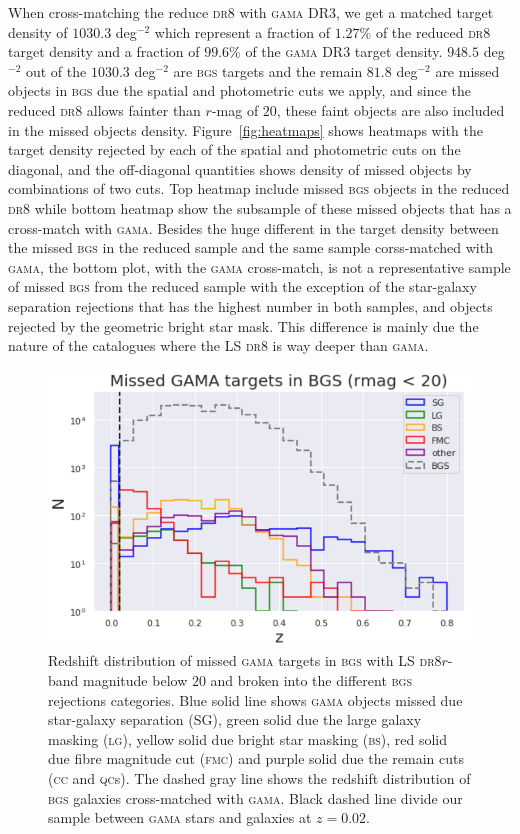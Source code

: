 \documentclass[fleqn,usenatbib]{mnras}
\newcommand{\BGS}{\textsc{bgs}\xspace}
\newcommand{\BS}{\textsc{bs}\xspace}
\newcommand{\CC}{\textsc{cc}\xspace}
\newcommand{\DReight}{\textsc{dr8}\xspace}
\newcommand{\FMC}{{\textsc{fmc}}\xspace}
\newcommand{\GAMA}{\textsc{gama}\xspace}
\newcommand{\LG}{\textsc{lg}\xspace}
\newcommand{\QCs}{\textsc{qc}s\xspace}
\begin{document}
When cross-matching the reduce \DReight with \GAMA DR3, we get a matched target density of $1030.3$ deg$^{-2}$ which represent a fraction of $1.27 \%$ of the reduced \DReight target density and a fraction of $99.6 \%$ of the \GAMA DR3 target density. $948.5$ deg$^{-2}$ out of the $1030.3$ deg$^{-2}$ are \BGS targets and the remain $81.8$ deg$^{-2}$ are missed objects in \BGS due the spatial and photometric cuts we apply, and since the reduced \DReight allows fainter than $r$-mag of $20$, these faint objects are also included in the missed objects density. Figure~\ref{fig:heatmaps} shows heatmaps with the target density rejected by each of the spatial and photometric cuts on the diagonal, and the off-diagonal quantities shows density of missed objects by combinations of two cuts. Top heatmap include missed \BGS objects in the reduced \DReight while bottom heatmap show the subsample of these missed objects that has a cross-match with \GAMA. Besides the huge different in the target density between the missed \BGS in the reduced sample and the same sample corss-matched with \GAMA, the bottom plot, with the \GAMA cross-match, is not a representative sample of missed \BGS from the reduced sample with the exception of the star-galaxy separation rejections that has the highest number in both samples, and objects rejected by the geometric bright star mask. This difference is mainly due the nature of the catalogues where the LS \DReight is way deeper than \GAMA.

\begin{figure}
	\includegraphics[width=\columnwidth]{images/rejs_gama_redshift}
    \caption{Redshift distribution of missed \GAMA targets in \BGS with LS \DReight $r$-band magnitude below $20$ and broken into the different \BGS rejections categories. Blue solid line shows \GAMA objects missed due star-galaxy separation (SG), green solid due the large galaxy masking (\LG), yellow solid due bright star masking (\BS), red solid due fibre magnitude cut (\FMC) and purple solid due the remain cuts (\CC and \QCs). The dashed gray line shows the redshift distribution of \BGS galaxies cross-matched with \GAMA. Black dashed line divide our sample between \GAMA stars and galaxies at $z=0.02$.}
    \label{fig:rejs_gama_z}
\end{figure}
\end{document}
